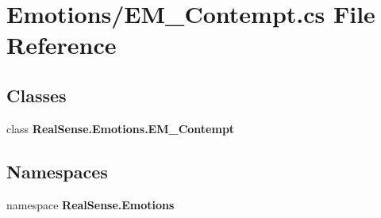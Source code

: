\section{Emotions/\+E\+M\+\_\+\+Contempt.cs File Reference}
\label{_e_m___contempt_8cs}
\subsection*{Classes}
\begin{DoxyCompactItemize}
\item 
class \textbf{ Real\+Sense.\+Emotions.\+E\+M\+\_\+\+Contempt}
\end{DoxyCompactItemize}
\subsection*{Namespaces}
\begin{DoxyCompactItemize}
\item 
namespace \textbf{ Real\+Sense.\+Emotions}
\end{DoxyCompactItemize}

